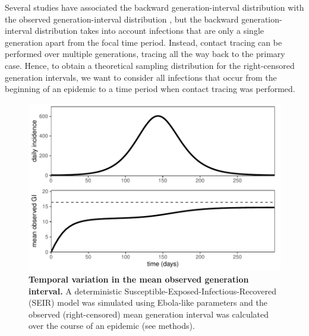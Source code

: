 \documentclass[12pt]{article}
\begin{document}
Several studies have associated the backward generation-interval distribution with the observed generation-interval distribution \citep{tomba2010some, nishiura2010time, champredon2015intrinsic}, but the backward generation-interval distribution takes into account infections that are only a single generation apart from the focal time period.
Instead, contact tracing can be performed over multiple generations, tracing all the way back to the primary case.
Hence, to obtain a theoretical sampling distribution for the right-censored generation intervals, we want to consider all infections that occur from the beginning of an epidemic to a time period when contact tracing was performed.

\begin{figure}[t]
\includegraphics[width=\textwidth]{../fig/temporal_effect.pdf}
\caption{\textbf{Temporal variation in the mean observed generation interval.}
A deterministic Susceptible-Exposed-Infectious-Recovered (SEIR) model was simulated using Ebola-like parameters and the observed (right-censored) mean generation interval was calculated over the course of an epidemic (see methods).
}
\label{fig:censor}
\end{figure}
\end{document}
